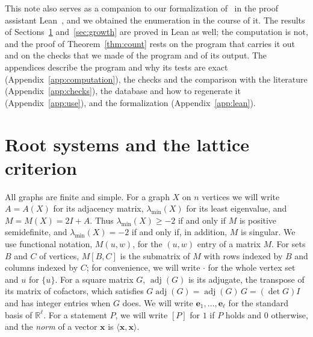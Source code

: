 \documentclass[11pt]{article}
\newcommand\re{{\mathbb R}}%
\newcommand\Zx{{\mathbf x}}
\newcommand\ip[2]{\langle#1,#2\rangle}
\theoremstyle{definition}
\newcommand{\lmin}{\lambda_{\min}}
\newcommand\Ze{{\mathbf e}}
\begin{document}
This note also serves as a companion to our formalization of~\cite{CGSS} in the proof assistant
Lean~\cite{dMU21}, and we obtained the enumeration in the course of it. The results of
Sections~\ref{sec:lattices} and~\ref{sec:growth} are proved in Lean as well; the computation is
not, and the proof of Theorem~\ref{thm:count} rests on the program that carries it out and on
the checks that we made of the program and of its output. The appendices describe the program
and why its tests are exact (Appendix~\ref{app:computation}), the checks and the comparison with
the literature (Appendix~\ref{app:checks}), the database and how to regenerate it
(Appendix~\ref{app:use}), and the formalization (Appendix~\ref{app:lean}).

\section{Root systems and the lattice criterion}\label{sec:lattices}

All graphs are finite and simple. For a graph $X$ on $n$ vertices we will write $A=A(X)$ for its
adjacency matrix, $\lmin(X)$ for its least eigenvalue, and $M=M(X)=2I+A$. Thus $\lmin(X)\ge-2$ if
and only if $M$ is positive semidefinite, and $\lmin(X)=-2$ if and only if, in addition, $M$ is
singular. We use functional notation, $M(u,w)$, for the $(u,w)$ entry of a matrix $M$. For sets
$B$ and $C$ of vertices, $M[B,C]$ is the submatrix of $M$ with rows indexed by $B$ and columns
indexed by $C$; for convenience, we will write $\cdot$ for the whole vertex set and $u$ for
$\{u\}$. For a square matrix $G$, $\operatorname{adj}(G)$ is its adjugate, the transpose of its
matrix of cofactors, which satisfies $G\operatorname{adj}(G)=\operatorname{adj}(G)\,G=(\det G)I$
and has integer entries when $G$ does. We will write $\Ze_1,\dots,\Ze_\ell$ for the standard
basis of $\re^\ell$. For a statement $P$, we will write $[P]$ for $1$ if $P$ holds and $0$
otherwise, and the \textsl{norm} of a vector $\Zx$ is $\ip{\Zx}{\Zx}$.
\end{document}
